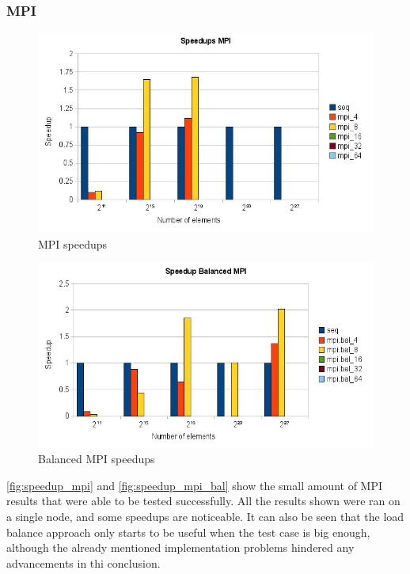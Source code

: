 \subsubsection{MPI}


\begin{figure}[!htpb]
	\begin{center}
	\includegraphics[width=\columnwidth]{images/speedup_mpi}
	\end{center}
	\caption{MPI speedups}
	\label{fig:speedup_mpi}
\end{figure}

\begin{figure}[!htpb]
	\begin{center}
	\includegraphics[width=\columnwidth]{images/speedup_mpi_bal}
	\end{center}
	\caption{Balanced MPI speedups}
	\label{fig:speedup_mpi_bal}
\end{figure}

\autoref{fig:speedup_mpi} and \autoref{fig:speedup_mpi_bal} show the small amount of MPI results that were able to be tested successfully. All the results shown were ran on a single node, and some speedups are noticeable. It can also be seen that the load balance approach only starts to be useful when the test case is big enough, although the already mentioned implementation problems hindered any advancements in thi conclusion.
